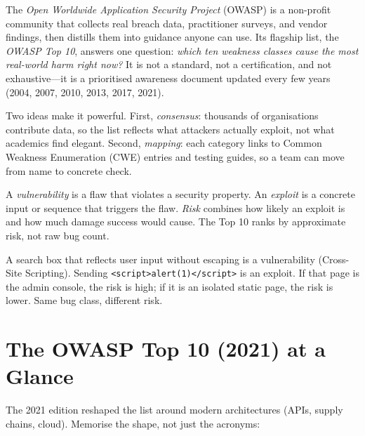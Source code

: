 The \emph{Open Worldwide Application Security Project} (OWASP) is a non-profit community that collects real breach data, practitioner surveys, and vendor findings, then distills them into guidance anyone can use. Its flagship list, the \emph{OWASP Top 10}, answers one question: \emph{which ten weakness classes cause the most real-world harm right now?} It is not a standard, not a certification, and not exhaustive---it is a prioritised awareness document updated every few years (2004, 2007, 2010, 2013, 2017, 2021).

Two ideas make it powerful. First, \emph{consensus}: thousands of organisations contribute data, so the list reflects what attackers actually exploit, not what academics find elegant. Second, \emph{mapping}: each category links to Common Weakness Enumeration (CWE) entries and testing guides, so a team can move from name to concrete check.

\begin{definition}\label{def:ver}
A \emph{vulnerability} is a flaw that violates a security property. An \emph{exploit} is a concrete input or sequence that triggers the flaw. \emph{Risk} combines how likely an exploit is and how much damage success would cause. The Top 10 ranks by approximate risk, not raw bug count.
\end{definition}

\begin{example}
A search box that reflects user input without escaping is a vulnerability (Cross-Site Scripting). Sending \texttt{<script>alert(1)</script>} is an exploit. If that page is the admin console, the risk is high; if it is an isolated static page, the risk is lower. Same bug class, different risk.
\end{example}

\section{The OWASP Top 10 (2021) at a Glance}\label{sec:top10}
The 2021 edition reshaped the list around modern architectures (APIs, supply chains, cloud). Memorise the shape, not just the acronyms:


